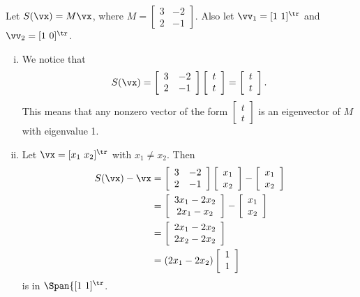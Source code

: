 \item Let $S(\vx) = M\vx$, where $M = \left[ \begin{array}{cr} 3&-2\\2&-1 \end{array} \right]$. Also let $\vv_1 = [1 \ 1]^{\tr}$ and $\vv_2 = [1 \ 0]^{\tr}$. 
	\begin{enumerate}[i.]
	\item  We notice that 
\[S(\vx) = \left[ \begin{array}{cr} 3&-2\\2&-1 \end{array} \right]  \left[ \begin{array}{c} t\\t \end{array} \right] = \left[ \begin{array}{c} t\\t \end{array} \right].\]
This means that any nonzero vector of the form $\left[ \begin{array}{c} t\\t \end{array} \right]$ is an eigenvector of $M$ with eigenvalue 1. 

	\item  Let $\vx = [x_1 \ x_2]^{\tr}$ with $x_1 \neq x_2$. Then
\begin{align*}
S(\vx) - \vx &= \left[ \begin{array}{cr} 3&-2\\2&-1 \end{array} \right]  \left[ \begin{array}{c} x_1\\x_2 \end{array} \right] -  \left[ \begin{array}{c} x_1\\x_2 \end{array} \right] \\
	&=  \left[ \begin{array}{c} 3x_1-2x_2\\2x_1-x_2 \end{array} \right] - \left[ \begin{array}{c} x_1\\x_2 \end{array} \right] \\
	&=  \left[ \begin{array}{c} 2x_1-2x_2\\2x_2-2x_2 \end{array} \right] \\
	&= (2x_1-2x_2)\left[ \begin{array}{c} 1\\1 \end{array} \right]
\end{align*}
is in $\Span\{ [1 \ 1]^{\tr}$. 
	

\end{enumerate}
